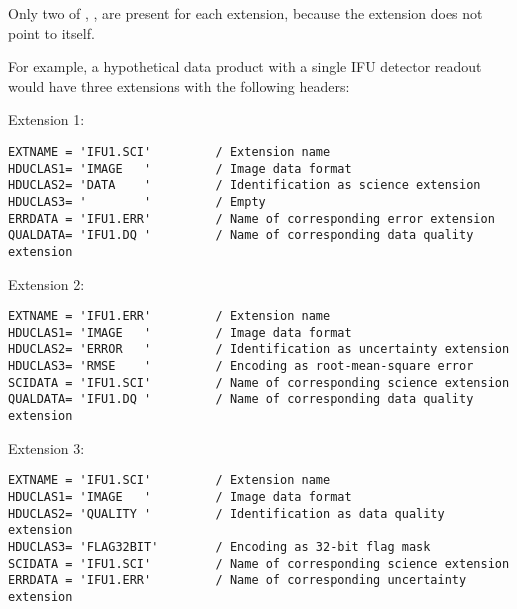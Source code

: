 Only two of , ,  are present for each
extension, because the extension does not point to itself.

For example, a hypothetical data product with a single \ac{IFU} detector
readout would have three extensions with the following headers:

Extension 1:
\begin{verbatim}
EXTNAME = 'IFU1.SCI'         / Extension name
HDUCLAS1= 'IMAGE   '         / Image data format
HDUCLAS2= 'DATA    '         / Identification as science extension
HDUCLAS3= '        '         / Empty
ERRDATA = 'IFU1.ERR'         / Name of corresponding error extension
QUALDATA= 'IFU1.DQ '         / Name of corresponding data quality extension
\end{verbatim}

Extension 2:
\begin{verbatim}
EXTNAME = 'IFU1.ERR'         / Extension name
HDUCLAS1= 'IMAGE   '         / Image data format
HDUCLAS2= 'ERROR   '         / Identification as uncertainty extension
HDUCLAS3= 'RMSE    '         / Encoding as root-mean-square error
SCIDATA = 'IFU1.SCI'         / Name of corresponding science extension
QUALDATA= 'IFU1.DQ '         / Name of corresponding data quality extension
\end{verbatim}

Extension 3:
\begin{verbatim}
EXTNAME = 'IFU1.SCI'         / Extension name
HDUCLAS1= 'IMAGE   '         / Image data format
HDUCLAS2= 'QUALITY '         / Identification as data quality extension
HDUCLAS3= 'FLAG32BIT'        / Encoding as 32-bit flag mask
SCIDATA = 'IFU1.SCI'         / Name of corresponding science extension
ERRDATA = 'IFU1.ERR'         / Name of corresponding uncertainty extension
\end{verbatim}





